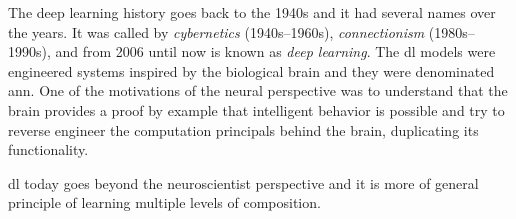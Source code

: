 The deep learning history goes back to the 1940s and it had several names over the years. It was called by \emph{cybernetics} (1940s--1960s), \emph{connectionism} (1980s--1990s), and from 2006 until now is known as \emph{deep learning}.
The \gls*{dl} models were engineered systems inspired by the biological brain and they were denominated \gls*{ann}.
One of the motivations of the neural perspective was to understand that the brain provides a proof by example that intelligent behavior is possible and try to reverse engineer the computation principals behind the brain, duplicating its functionality.

\gls*{dl} today goes beyond the neuroscientist perspective and it is more of general principle of learning multiple levels of composition.






